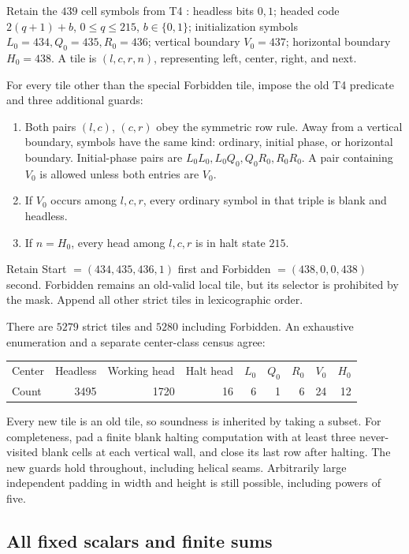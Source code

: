 \documentclass[11pt]{article}
\theoremstyle{remark}\newtheorem{remark}[theorem]{Remark}
\begin{document}
Retain the \(439\) cell symbols from T4 \cite{p11}: headless bits \(0,1\);
headed code \(2(q+1)+b\), \(0\le q\le215\), \(b\in\{0,1\}\);
initialization symbols \(L_0=434,Q_0=435,R_0=436\);
vertical boundary \(V_0=437\); horizontal boundary \(H_0=438\).
A tile is \((l,c,r,n)\), representing left, center, right, and next.

For every tile other than the special Forbidden tile, impose the
old T4 predicate and three additional guards:
\begin{enumerate}
 \item Both pairs \((l,c)\), \((c,r)\) obey the symmetric row rule.
 Away from a vertical boundary, symbols have the same kind:
 ordinary, initial phase, or horizontal boundary. Initial-phase
 pairs are \(L_0L_0,L_0Q_0,Q_0R_0,R_0R_0\). A pair containing
 \(V_0\) is allowed unless both entries are \(V_0\).
 \item If \(V_0\) occurs among \(l,c,r\), every ordinary symbol
 in that triple is blank and headless.
 \item If \(n=H_0\), every head among \(l,c,r\) is in halt state \(215\).
\end{enumerate}
Retain Start \(=(434,435,436,1)\) first and Forbidden
\(=(438,0,0,438)\) second. Forbidden remains an old-valid local
tile, but its selector is prohibited by the mask. Append all other
strict tiles in lexicographic order.

There are \(5279\) strict tiles and \(5280\) including Forbidden.
An exhaustive enumeration and a separate center-class census agree:
\begin{center}
\begin{tabular}{lrrrrrrrr}
\toprule
Center & Headless & Working head & Halt head & \(L_0\)&\(Q_0\)&\(R_0\)&\(V_0\)&\(H_0\)\\
Count &3495&1720&16&6&1&6&24&12\\
\bottomrule
\end{tabular}
\end{center}

Every new tile is an old tile, so soundness is inherited by taking a
subset. For completeness, pad a finite blank halting computation
with at least three never-visited blank cells at each vertical wall,
and close its last row after halting. The new guards hold throughout,
including helical seams. Arbitrarily large independent padding in
width and height is still possible, including powers of five.

\subsection{All fixed scalars and finite sums}
\end{document}

